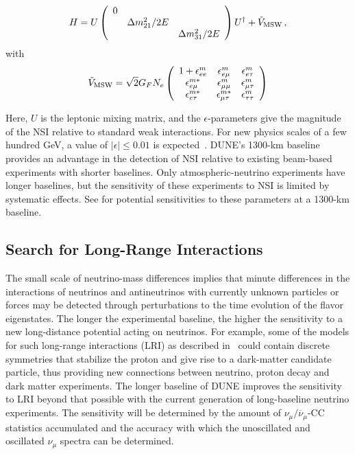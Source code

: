 \begin{equation}
  H = U \left( \begin{array}{ccc}
           0 &                    & \\
             & \Delta m_{21}^2/2E & \\
             &                    & \Delta m_{31}^2/2E
         \end{array} \right) U^\dag + \tilde{V}_{\rm MSW} \,,
\end{equation}
with
\begin{equation}
  \tilde{V}_{\rm MSW} = \sqrt{2} G_F N_e
\left(
  \begin{array}{ccc}
    1 + \epsilon^m_{ee}       & \epsilon^m_{e\mu}       & \epsilon^m_{e\tau}  \\
        \epsilon^{m*}_{e\mu}  & \epsilon^m_{\mu\mu}     & \epsilon^m_{\mu\tau} \\
        \epsilon^{m*}_{e\tau} & \epsilon^{m*}_{\mu\tau} & \epsilon^m_{\tau\tau}
  \end{array} 
\right)
\end{equation}

Here, $U$ is the leptonic mixing matrix, and the $\epsilon$-parameters give the
magnitude of the NSI relative to standard weak interactions.  For new physics
scales of a few hundred GeV,  a value of $|\epsilon| \leq 0.01$ is
expected~\cite{Davidson:2003ha,GonzalezGarcia:2007ib,Biggio:2009nt}.
DUNE's 1300-km baseline provides an advantage in the detection of NSI relative
to existing beam-based experiments with shorter baselines.
Only atmospheric-neutrino experiments have longer baselines, but the sensitivity
of these experiments to NSI is limited by systematic effects. See \cite{Adams:2013qkq}
for potential sensitivities to these parameters at a 1300-km baseline.

\subsection{Search for Long-Range Interactions}

The small scale of neutrino-mass differences implies that minute
differences in the interactions of neutrinos and antineutrinos with
currently unknown particles or forces may be detected through 
perturbations to the time evolution of the flavor eigenstates.  
The longer the experimental
baseline, the higher the sensitivity to a new long-distance potential
acting on neutrinos. For example, some of the models for such
long-range interactions (LRI) as described in~\cite{Davoudiasl:2011sz} could contain discrete symmetries that
stabilize the proton and give rise to a dark-matter candidate particle,
thus providing new
connections between neutrino, proton decay and dark matter
experiments. The longer baseline of DUNE improves the sensitivity to
LRI beyond that possible with the current generation of long-baseline
neutrino experiments. The sensitivity will be determined by the amount
of $\nu_\mu/\overline{\nu}_\mu$-CC statistics accumulated and the accuracy
with which the unoscillated and oscillated $\nu_\mu$ spectra can be
determined.

